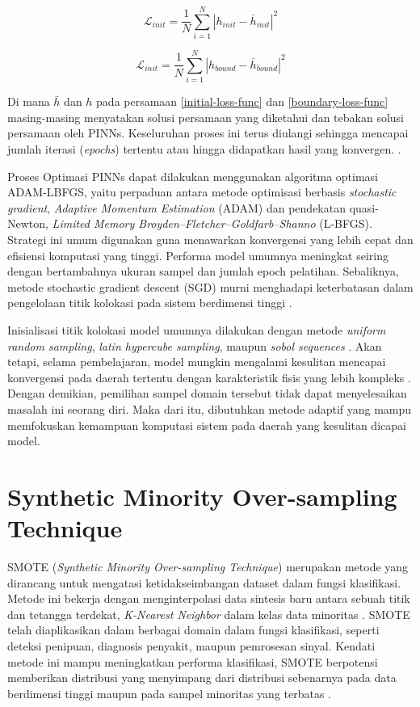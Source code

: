 \begin{equation}
    \label{initial-loss-func}
    \mathcal{L}_{init} = \frac{1}{N}\sum_{i=1}^N|h_{init} - \bar{h}_{init}|^2
\end{equation}

\begin{equation}
    \label{boundary-loss-func}
    \mathcal{L}_{init} = \frac{1}{N}\sum_{i=1}^N|h_{bound} - \bar{h}_{bound}|^2
\end{equation}

\noindent
Di mana $\bar{h}$ dan $h$ pada persamaan \eqref{initial-loss-func} dan \eqref{boundary-loss-func} masing-masing menyatakan solusi persamaan yang diketahui dan tebakan solusi persamaan oleh PINNs. Keseluruhan proses ini terus diulangi sehingga mencapai jumlah iterasi (\emph{epochs}) tertentu atau hingga didapatkan hasil yang konvergen. . 

Proses Optimasi PINNs dapat dilakukan menggunakan algoritma optimasi ADAM-LBFGS, yaitu perpaduan antara metode optimisasi berbasis \emph{stochastic gradient}, \emph{Adaptive Momentum Estimation} (ADAM) dan pendekatan quasi-Newton, \emph{Limited Memory Broyden–Fletcher–Goldfarb–Shanno} (L-BFGS). Strategi ini umum digunakan guna menawarkan konvergensi yang lebih cepat dan efisiensi komputasi yang tinggi. Performa model umumnya meningkat seiring dengan bertambahnya ukuran sampel dan jumlah epoch pelatihan. Sebaliknya, metode stochastic gradient descent (SGD) murni menghadapi keterbatasan dalam pengelolaan titik kolokasi pada sistem berdimensi tinggi .

Inisialisasi titik kolokasi model umumnya dilakukan dengan metode \emph{uniform random sampling}, \emph{latin hypercube sampling}, maupun \emph{sobol sequences} . Akan tetapi, selama pembelajaran, model mungkin mengalami kesulitan mencapai konvergensi pada daerah tertentu dengan karakteristik fisis yang lebih kompleks \cite{LiuAdapt}. Dengan demikian, pemilihan sampel domain tersebut tidak dapat menyelesaikan masalah ini seorang diri. Maka dari itu, dibutuhkan metode adaptif yang mampu memfokuskan kemampuan komputasi sistem pada daerah yang kesulitan dicapai model. 

\section{Synthetic Minority Over-sampling Technique}

SMOTE (\emph{Synthetic Minority Over-sampling Technique}) merupakan metode yang dirancang untuk mengatasi ketidakseimbangan dataset dalam fungsi klasifikasi. Metode ini bekerja dengan menginterpolasi data sintesis baru antara sebuah titik dan tetangga terdekat, \emph{K-Nearest Neighbor} dalam kelas data minoritas . SMOTE telah diaplikasikan dalam berbagai domain dalam fungsi klasifikasi, seperti deteksi penipuan, diagnosis penyakit, maupun pemrosesan sinyal. Kendati metode ini mampu meningkatkan performa klasifikasi, SMOTE berpotensi memberikan distribusi yang menyimpang dari distribusi sebenarnya pada data berdimensi tinggi maupun pada sampel minoritas yang terbatas .